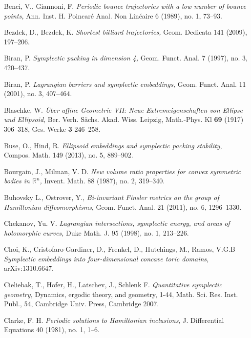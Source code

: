 \documentclass{icmart}
\theoremstyle{definition}
\begin{document}
\begin{thebibliography}{7}
 Benci, V., Giannoni, F. {\it Periodic bounce trajectories with a low number of bounce points,}
Ann. Inst. H. Poincar\'e Anal. Non Lin\'eaire 6 (1989), no. 1, 73--93. 

 Bezdek, D.,  Bezdek, K. {\it Shortest billiard trajectories,} 
Geom. Dedicata 141 (2009), 197--206. 

 Biran, P. {\it Symplectic packing in dimension 4,} Geom. Funct. Anal. 7 (1997), no. 3, 420--437. 


 Biran, P. {\it  Lagrangian barriers and symplectic embeddings,} Geom. Funct. Anal. 11 (2001), no. 3, 407--464.



 Blaschke, W. {\it \"Uber affine Geometrie VII: Neue Extremeigenschaften
von Ellipse und Ellipsoid}, Ber. Verh. S\"achs. Akad. Wiss. Leipzig,
Math.-Phys. Kl {\bf 69} (1917) 306--318, Ges. Werke {\bf 3} 246--258.

 Buse, O., Hind, R. {\it Ellipsoid embeddings and symplectic  packing  stability},  Compos. Math. 149 (2013), no. 5, 889--902. 



 Bourgain, J., Milman, V. D. {\it New volume ratio properties for convex
symmetric bodies in ${\mathbb R}^n$,} Invent. Math. 88 (1987), no.
2, 319--340.

 Buhovsky L., Ostrover, Y., {\it Bi-invariant Finsler metrics on the group of Hamiltonian diffeomorphisms}, 
Geom. Funct. Anal. 21 (2011), no. 6, 1296--1330. 

 Chekanov, Yu. V. {\it Lagrangian intersections, symplectic energy, and areas of holomorphic curves,} Duke Math. J. 95 (1998), no. 1, 213--226.



 Choi, K., Cristofaro-Gardiner, D., Frenkel, D., Hutchings, M., Ramos, V.G.B {\it Symplectic embeddings into four-dimensional concave toric domains,} arXiv:1310.6647.



 Cieliebak, T., Hofer, H., Latschev, J., Schlenk
F. {\it Quantitative symplectic geometry,}  Dynamics, ergodic
theory, and geometry, 1-44,  Math. Sci. Res. Inst. Publ., 54,
Cambridge Univ. Press, Cambridge 2007.

 Clarke, F. H. {\it Periodic solutions to Hamiltonian inclusions, } J. Differential Equations 40 (1981), no. 1, 1--6. 


\end{thebibliography}
\end{document}
